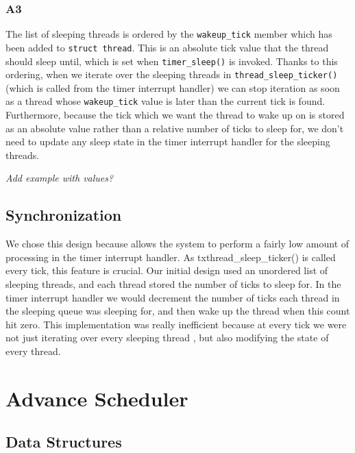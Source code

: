 \documentclass[a4wide, 11pt]{article}
\newcommand{\tx}{\texttt}
\begin{document}
\subsubsection{A3}

The list of sleeping threads is ordered by the \tx{wakeup\_tick} member
which has been added to \tx{struct thread}. This is an absolute tick value that the thread 
should sleep until, which is set when \tx{timer\_sleep()} is invoked. Thanks to this ordering, when we iterate over the sleeping threads in \tx{thread\_sleep\_ticker()} (which is called from the
timer interrupt handler) we can stop iteration as soon as a thread whose
\tx{wakeup\_tick} value is later than the current tick is found.
\\
Furthermore, because the tick which we want the thread to wake up on is stored as
an absolute value rather than a relative number of ticks to sleep for, we don't
need to update any sleep state in the timer interrupt handler for the sleeping
threads.

\emph{Add example with values?}

\subsection{Synchronization}

We chose this design because allows the system to perform a fairly low amount of processing in the
timer interrupt handler. As tx{thread\_sleep\_ticker()} is called every tick, this feature is crucial. Our
initial design used an unordered list of sleeping threads, and each thread
stored the number of ticks to sleep for. In the timer interrupt handler we
would decrement the number of ticks each thread in the sleeping queue was
sleeping for, and then wake up the thread when this count hit zero. This implementation was
really inefficient because at every tick we were not just iterating over every sleeping
thread , but also modifying the state of every thread.

\section{Advance Scheduler}
\subsection{Data Structures}
\end{document}
